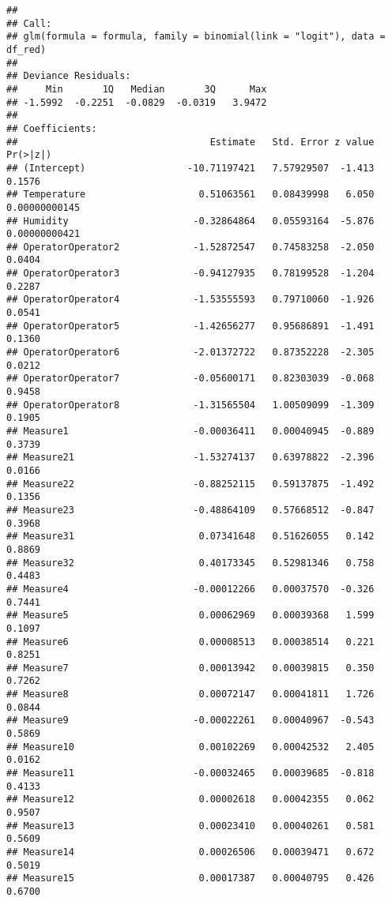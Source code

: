 \documentclass[
]{article}
\begin{document}
\begin{verbatim}
## 
## Call:
## glm(formula = formula, family = binomial(link = "logit"), data = df_red)
## 
## Deviance Residuals: 
##     Min       1Q   Median       3Q      Max  
## -1.5992  -0.2251  -0.0829  -0.0319   3.9472  
## 
## Coefficients:
##                                  Estimate   Std. Error z value      Pr(>|z|)
## (Intercept)                  -10.71197421   7.57929507  -1.413        0.1576
## Temperature                    0.51063561   0.08439998   6.050 0.00000000145
## Humidity                      -0.32864864   0.05593164  -5.876 0.00000000421
## OperatorOperator2             -1.52872547   0.74583258  -2.050        0.0404
## OperatorOperator3             -0.94127935   0.78199528  -1.204        0.2287
## OperatorOperator4             -1.53555593   0.79710060  -1.926        0.0541
## OperatorOperator5             -1.42656277   0.95686891  -1.491        0.1360
## OperatorOperator6             -2.01372722   0.87352228  -2.305        0.0212
## OperatorOperator7             -0.05600171   0.82303039  -0.068        0.9458
## OperatorOperator8             -1.31565504   1.00509099  -1.309        0.1905
## Measure1                      -0.00036411   0.00040945  -0.889        0.3739
## Measure21                     -1.53274137   0.63978822  -2.396        0.0166
## Measure22                     -0.88252115   0.59137875  -1.492        0.1356
## Measure23                     -0.48864109   0.57668512  -0.847        0.3968
## Measure31                      0.07341648   0.51626055   0.142        0.8869
## Measure32                      0.40173345   0.52981346   0.758        0.4483
## Measure4                      -0.00012266   0.00037570  -0.326        0.7441
## Measure5                       0.00062969   0.00039368   1.599        0.1097
## Measure6                       0.00008513   0.00038514   0.221        0.8251
## Measure7                       0.00013942   0.00039815   0.350        0.7262
## Measure8                       0.00072147   0.00041811   1.726        0.0844
## Measure9                      -0.00022261   0.00040967  -0.543        0.5869
## Measure10                      0.00102269   0.00042532   2.405        0.0162
## Measure11                     -0.00032465   0.00039685  -0.818        0.4133
## Measure12                      0.00002618   0.00042355   0.062        0.9507
## Measure13                      0.00023410   0.00040261   0.581        0.5609
## Measure14                      0.00026506   0.00039471   0.672        0.5019
## Measure15                      0.00017387   0.00040795   0.426        0.6700

\end{verbatim}
\end{document}
